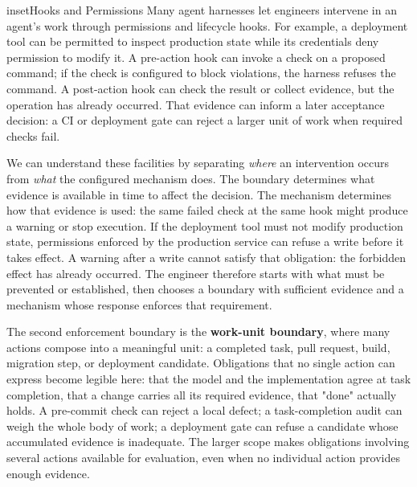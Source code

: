 


\begin{bookbox}{inset}{Hooks and Permissions}
\label{inset-hooks-and-permissions}
Many agent harnesses let engineers intervene in an agent's work through permissions and lifecycle hooks. For example, a deployment tool can be permitted to inspect production state while its credentials deny permission to modify it. A pre-action hook can invoke a check on a proposed command; if the check is configured to block violations, the harness refuses the command. A post-action hook can check the result or collect evidence, but the operation has already occurred. That evidence can inform a later acceptance decision: a CI or deployment gate can reject a larger unit of work when required checks fail.

We can understand these facilities by separating \emph{where} an intervention occurs from \emph{what} the configured mechanism does. The boundary determines what evidence is available in time to affect the decision. The mechanism determines how that evidence is used: the same failed check at the same hook might produce a warning or stop execution. If the deployment tool must not modify production state, permissions enforced by the production service can refuse a write before it takes effect. A warning after a write cannot satisfy that obligation: the forbidden effect has already occurred. The engineer therefore starts with what must be prevented or established, then chooses a boundary with sufficient evidence and a mechanism whose response enforces that requirement.
\end{bookbox}



The second enforcement boundary is the \textbf{work-unit boundary}, where many actions compose into a meaningful unit: a completed task, pull request, build, migration step, or deployment candidate. Obligations that no single action can express become legible here: that the model and the implementation agree at task completion, that a change carries all its required evidence, that "done" actually holds. A pre-commit check can reject a local defect; a task-completion audit can weigh the whole body of work; a deployment gate can refuse a candidate whose accumulated evidence is inadequate. The larger scope makes obligations involving several actions available for evaluation, even when no individual action provides enough evidence.

